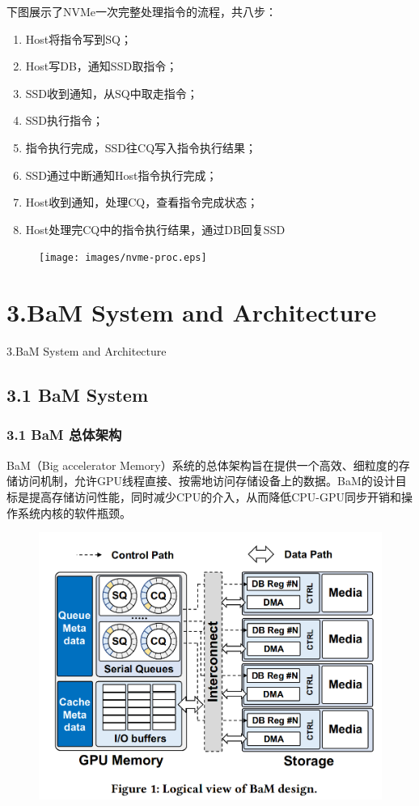 \documentclass[10pt]{ctexbeamer}
\begin{document}
\begin{frame}
  下图展示了NVMe一次完整处理指令的流程，共八步：
  \begin{enumerate}
    \item Host将指令写到SQ；
    \item Host写DB，通知SSD取指令；
    \item SSD收到通知，从SQ中取走指令；
    \item SSD执行指令；
    \item 指令执行完成，SSD往CQ写入指令执行结果；
    \item SSD通过中断通知Host指令执行完成；
    \item Host收到通知，处理CQ，查看指令完成状态；
    \item Host处理完CQ中的指令执行结果，通过DB回复SSD
  \end{enumerate}
  \begin{figure}
    \texttt{[image: images/nvme-proc.eps]}
  \end{figure}
  
\end{frame}

\section[3.Architecture]{3.BaM System and Architecture}\label{sec:3}
\begin{frame}
  \begin{center}
    \Huge 3.BaM System and Architecture
  \end{center}
\end{frame}
\subsection{3.1 BaM System}\label{sec:3-1}
\begin{frame}
  \frametitle{3.1 BaM 总体架构}
  BaM（Big accelerator Memory）系统的总体架构旨在提供一个高效、细粒度的存储访问机制，允许GPU线程直接、按需地访问存储设备上的数据。BaM的设计目标是提高存储访问性能，同时减少CPU的介入，从而降低CPU-GPU同步开销和操作系统内核的软件瓶颈。
  \begin{figure}
    \includegraphics[width=.5\textwidth, height=.5\textheight, keepaspectratio]{images/bam.png}
  \end{figure}
\end{frame}
\end{document}
